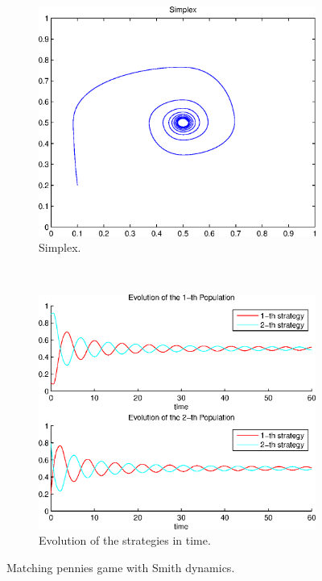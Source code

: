 \begin{figure}[h]
  \centering
  \begin{subfigure}[b]{0.45\textwidth}
	  \includegraphics[width=\textwidth]{./images/test2_simplex_smith.eps}
	  \caption{Simplex.}
	  \label{fig:test2_simplex_smith}
  \end{subfigure}
  ~ 
  \begin{subfigure}[b]{0.45\textwidth}
	  \includegraphics[width=\textwidth]{./images/test2_ev_smith.eps}
	  \caption{Evolution of the strategies in time.}
	  \label{fig:test2_ev_smith}
  \end{subfigure}
  \caption{Matching pennies game with Smith dynamics.}
  \label{fig:mp_game_smith}
\end{figure}



